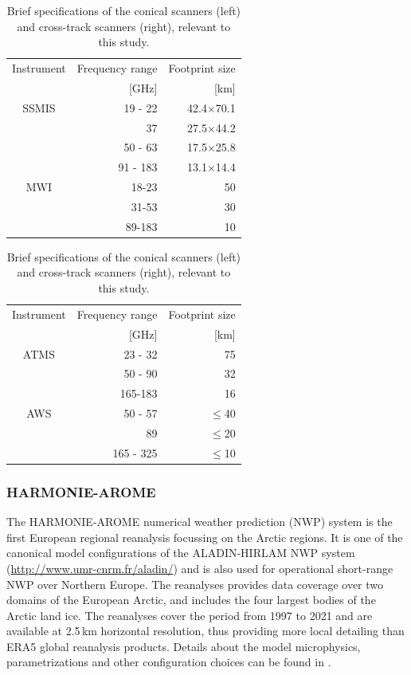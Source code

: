\documentclass[12pt,oneside,a4paper]{article}
\begin{document}
\begin{table}[t]
	\footnotesize
	\centering
	\caption{Brief specifications of the conical scanners (left) and cross-track scanners (right), relevant to this study.}
	\label{tab:specifications_instruments}	
	\parbox{.45\linewidth}{
	\centering
	\begin{tabular}{crr}
	\toprule
		Instrument & Frequency range 	& Footprint size \\
					& [GHz]             & [km]       \\
		\midrule			
		SSMIS	   &19 - 22		& 42.4$\times$70.1	\\
				   &37          &27.5$\times$44.2  \\
				   &50 - 63       & 17.5$\times$25.8 \\
				   &91 - 183    &  13.1$\times$14.4\\
		\midrule
		MWI 	   &18-23 		&50\\
				   &31-53 		& 30\\
				   & 89-183 	& 10\\	
		\bottomrule		
	\end{tabular}
	}
\hfill
\parbox{.45\linewidth}{
	\centering
	\begin{tabular}{crr}
	\toprule
	Instrument & Frequency range 	& Footprint size \\
	& [GHz]             & [km]       \\
	\midrule			
	ATMS	    &23 - 32		& 75	\\
				&50 - 90        &32  \\
				&165-183        & 16 \\
	\midrule
	AWS 	   &50 - 57 		& $\le$40\\
			   &89 				& $\le$20\\
			   & 165 - 325 		& $\le$10\\	
	\bottomrule		
\end{tabular}
}
\end{table}



\subsubsection{HARMONIE-AROME}
%
\label{sec:harmonie}
The HARMONIE-AROME numerical weather prediction (NWP) system is the first
European regional reanalysis focussing on the Arctic regions. It is one of the canonical model configurations of the ALADIN-HIRLAM
NWP system (\url{http://www.umr-cnrm.fr/aladin/}) and is also used for operational short-range NWP over Northern Europe. The reanalyses provides data coverage over two domains of the European Arctic, and includes the four largest bodies of the Arctic land ice. The reanalyses cover the period from 1997 to 2021 and are available at 2.5\,km
horizontal resolution, thus providing more local detailing than ERA5 global reanalysis products. Details about the model microphysics, parametrizations and other configuration choices can be found in \citet{bengtsson:2017:harmo}.
 
\end{document}
